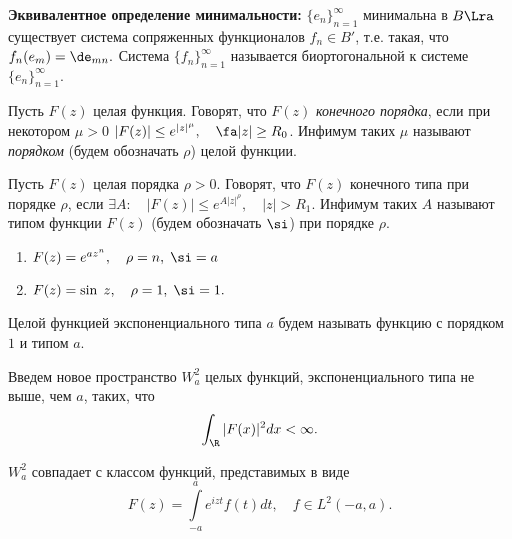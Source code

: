 \documentclass{article}
\begin{document}
\noindent\textbf{Эквивалентное определение минимальности:}
$\{e_n\}_{n=1}^{\infty}$ минимальна в $B\Lra$
существует система сопряженных функционалов $f_n\in B'$, т.е.
такая, что $f_n(e_m)=\de_{mn}.$ Система
$\{f_n\}_{n=1}^{\infty}$ называется биортогональной к системе
$\{e_n\}_{n=1}^{\infty}.$

\begin{df}
  Пусть $F(z)$ целая функция. Говорят, что
  $F(z)$ \emph{конечного порядка}, если при некотором $\mu>0$
  $|F(z)|\le e^{|z|^{\mu}},\quad\fa |z|\ge R_0$. Инфимум таких
  $\mu$ называют \emph{порядком} (будем обозначать $\rho$) целой
  функции.
\end{df}

\begin{df}
  Пусть $F(z)$ целая порядка $\rho>0.$
  Говорят, что $F(z)$ конечного типа при порядке $\rho$, если
  $\exi A:\quad|F(z)|\le e^{A|z|^{\rho}},\quad|z|>R_1.$ Инфимум
  таких $A$ называют типом функции $F(z)$ (будем обозначать
  $\si$) при порядке $\rho.$
\end{df}

\begin{ex}
  \begin{enumerate}
  \item
    $F(z)=e^{az^n},\quad\rho=n,\;\si=a$
  \item
    $F(z)=\sin\;z,\quad\rho=1,\;\si=1.$
  \end{enumerate}
\end{ex}

\begin{df}
  Целой функцией экспоненциального типа $a$
  будем называть функцию с порядком $1$ и типом $a$.
\end{df}

Введем новое пространство $W^2_a$ целых функций, экспоненциального
типа не выше, чем $a$, таких, что
$$\int_{\R }|F(x)|^2dx<\infty.$$

\begin{theorem}
$W^2_a$ совпадает с классом функций, представимых в виде
$$F(z)=\int\limits_{-a}^ae^{izt}f(t)dt,\quad f\in L^2(-a,a).$$
\end{theorem}
\end{document}
